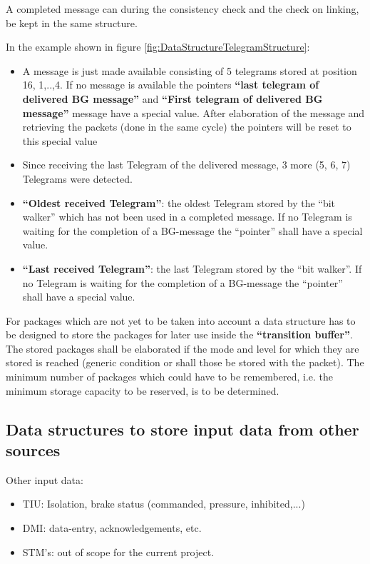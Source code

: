 A completed message can during the consistency check and the check on linking, be kept in the same structure.

In the example shown in figure \ref{fig:DataStructureTelegramStructure}:
\begin{itemize}
\item A message is just made available consisting of 5 telegrams stored at position 16, 1,..,4.
If no message is available the pointers \textbf{``last telegram of delivered BG message''} and \textbf{``First telegram of delivered BG message''} message have a special value. After elaboration of the message and retrieving the packets (done in the same cycle) the pointers will be reset to this special value
\item Since receiving the last Telegram of the delivered message, 3 more (5, 6, 7) Telegrams were detected.
\item \textbf{“Oldest received Telegram”}: the oldest Telegram stored by the “bit walker” which has not been used in a completed message. If no Telegram is waiting for the completion of a BG-message the “pointer” shall have a special value.
\item \textbf{“Last received Telegram”}: the last Telegram stored by the “bit walker”. If no Telegram is waiting for the completion of a BG-message the “pointer” shall have a special value.
\end{itemize}


For packages which are not yet to be taken into account a data structure has to be designed to store the packages for later use inside the \textbf{``transition buffer''}. The stored packages shall be elaborated if the mode and level for which they are stored is reached (generic condition or shall those be stored with the packet).
The minimum number of packages which could have to be remembered, i.e. the minimum storage capacity to be reserved, is to be determined.

\subsection{Data structures to store input data from other sources}

Other input data:
\begin{itemize}
\item TIU: Isolation, brake status (commanded, pressure, inhibited,...)
\item DMI: data-entry, acknowledgements, etc. 
\item STM's: out of scope for the current project. 
\end{itemize}

